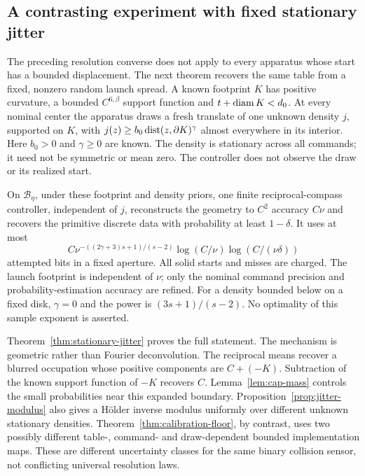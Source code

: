\subsection{A contrasting experiment with fixed stationary jitter}
The preceding resolution converse does not apply to every apparatus
whose start has a bounded displacement. The next theorem recovers the
same table from a fixed, nonzero random launch spread. A known footprint
$K$ has positive curvature, a bounded $C^{6,\beta}$ support function and
$t+\operatorname{diam} K<d_0$. At every nominal center the apparatus draws a fresh
translate of one unknown density $j$, supported on $K$, with
$j(z)\ge b_0\operatorname{dist}(z,\partial K)^\gamma$ almost everywhere in its
interior. Here $b_0>0$ and $\gamma\ge0$ are known. The density is
stationary across all commands; it need not be symmetric or mean zero.
The controller does not observe the draw or its realized start.

\begin{theorem}
\label{thm:fixed-spread-main}
On $\mathcal B_\eta$, under these footprint and density priors, one
finite reciprocal-compass controller, independent of $j$, reconstructs
the geometry to $C^2$ accuracy $C\nu$ and recovers the primitive discrete
data with probability at least $1-\delta$. It uses at most
\[
 C\nu^{-((2\gamma+3)s+1)/(s-2)}
               \log(C/\nu)\log(C/(\nu\delta))
\]
attempted bits in a fixed aperture. All solid starts and misses are
charged. The launch footprint is independent of $\nu$; only the nominal
command precision and probability-estimation accuracy are refined.
For a density bounded below on a fixed disk, $\gamma=0$ and the power
is $(3s+1)/(s-2)$. No optimality of this sample exponent is asserted.
\end{theorem}

Theorem~\ref{thm:stationary-jitter} proves the full statement.
The mechanism is geometric rather than Fourier deconvolution. The
reciprocal means recover a blurred occupation whose positive components
are $C+(-K)$. Subtraction of the known support function of $-K$ recovers
$C$. Lemma~\ref{lem:cap-mass} controls the small probabilities near
this expanded boundary. Proposition~\ref{prop:jitter-modulus} also
gives a H\"older inverse modulus uniformly over different unknown
stationary densities. Theorem~\ref{thm:calibration-floor}, by contrast,
uses two possibly different table-, command- and draw-dependent bounded
implementation maps. These are different uncertainty classes for the
same binary collision sensor, not conflicting universal resolution laws.
